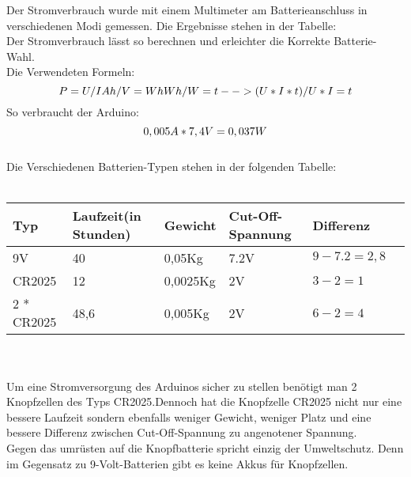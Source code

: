 Der Stromverbrauch wurde mit einem Multimeter am Batterieanschluss in
verschiedenen Modi gemessen. Die Ergebnisse stehen in der Tabelle:\\


Der Stromverbrauch lässt so berechnen und erleichter die Korrekte Batterie-Wahl.
\\
Die Verwendeten Formeln: 
\begin{equation}
    $$
    P = U / I
    Ah / V = Wh
    Wh / W = t --> (U*I*t) / U*I = t
    $$
\end{equation}
So verbraucht der Arduino:
\begin{equation}
    $$
    0,005 A * 7,4 V = 0,037 W
    $$
\end{equation}
\\
Die Verschiedenen Batterien-Typen stehen in der folgenden Tabelle:\\
\\
\begin{tabularx}{0.8\textwidth}{l|X|X|X|XX}
    Typ & Laufzeit(in Stunden) & Gewicht & Cut-Off-Spannung & Differenz\\
    \hline
    9V & 40 & 0,05Kg &7.2V & $9-7.2 = 2,8$\\
    \hline
    CR2025 & 12 & 0,0025Kg & 2V & $3-2 = 1$\\
    \hline
    2 * CR2025 & 48,6 & 0,005Kg & 2V & $6-2 = 4$\\
\end{tabularx}\\
\\
Um eine Stromversorgung des Arduinos sicher zu stellen benötigt man 2 Knopfzellen
des Typs CR2025.Dennoch hat die Knopfzelle CR2025 nicht nur eine bessere 
Laufzeit sondern ebenfalls weniger Gewicht, weniger Platz und eine bessere 
Differenz zwischen Cut-Off-Spannung zu angenotener Spannung.
\\
Gegen das umrüsten auf die Knopfbatterie spricht einzig der Umweltschutz. 
Denn im Gegensatz zu 9-Volt-Batterien gibt es keine Akkus für Knopfzellen.